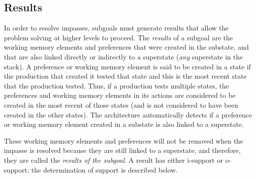 \subsection{Results}
\label{ARCH-impasses-results}

In order to resolve impasses, subgoals must generate results that allow
the problem solving at higher levels to proceed.  The {\em results} of a
subgoal are the working memory elements and preferences that were
created in the substate, and that are also linked directly or indirectly
to a superstate (\emph{any} superstate in the stack). A preference or
working memory element is said to be created in a state if the
production that created it tested that state and this is the most recent
state that the production tested. Thus, if a production tests multiple
states, the preferences and working memory elements in its actions are
considered to be created in the most recent of those states (and is not
considered to have been created in the other states). The architecture
automatically detects if a preference or working memory element created
in a substate is also linked to a superstate.

These working memory elements and preferences will not be removed when
the impasse is resolved because they are still linked to a superstate,
and therefore, they are called the \textit{results of the subgoal}.  A
result has either i-support or o-support; the determination of support is
described below.




